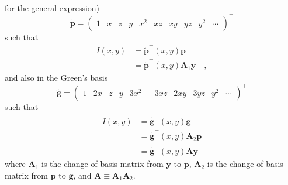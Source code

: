 \documentclass[12pt,dvipsnames]{report}
\begin{document}
\citet{2019AJ....157...64L} for the general expression)
\begin{equation}
    \tilde{\boldsymbol{p}}=\left(\begin{array}{llllllllll}
        1 & x & z & y & x^{2} & x z & x y & y z & y^{2} & \cdots
    \end{array}\right)^{\intercal}
\end{equation}
such that
\begin{align}
    I(x, y) & =\tilde{\mathbf{p}}^{\intercal}(x, y) \mathbf{p}                    \\
            & =\tilde{\mathbf{p}}^{\intercal}(x, y) \mathbf{A}_1 \mathbf{y}\quad,
    \label{eq:intensity_poly_basis}
\end{align}
and also in the Green's basis
\begin{equation}
    \tilde{\boldsymbol{g}}=\left(\begin{array}{llllllllll}
        1 & 2 x & z & y & 3 x^{2} & -3 x z & 2 x y & 3 y z & y^{2} & \cdots
    \end{array}\right)^{\intercal}
\end{equation}
such that
\begin{align}
    I(x, y) & =\tilde{\mathbf{g}}^{\intercal}(x, y) \mathbf{g}              \\
            & =\tilde{\mathbf{g}}^{\intercal}(x, y) \mathbf{A}_2 \mathbf{p} \\
            & =\tilde{\mathbf{g}}^{\intercal}(x, y) \mathbf{A} \mathbf{y}
\end{align}
where $\mathbf{A}_1$ is the change-of-basis matrix from $\mathbf{y}$ to $\mathbf{p}$,
$\mathbf{A}_2$ is the change-of-basis matrix from $\mathbf{p}$ to $\mathbf{g}$, and
$\mathbf{A}\equiv \mathbf{A}_1 \mathbf{A}_2$.
\end{document}
